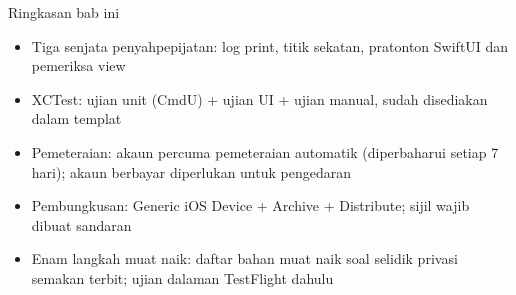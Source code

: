 \begin{tcbsummary}{Ringkasan bab ini}
\begin{itemize}
  \item Tiga senjata penyahpepijatan: log print, titik sekatan, pratonton SwiftUI dan pemeriksa view
  \item XCTest: ujian unit (CmdU) + ujian UI + ujian manual, sudah disediakan dalam templat
  \item Pemeteraian: akaun percuma pemeteraian automatik (diperbaharui setiap 7 hari); akaun berbayar diperlukan untuk pengedaran
  \item Pembungkusan: Generic iOS Device + Archive + Distribute; sijil wajib dibuat sandaran
  \item Enam langkah muat naik: daftar bahan muat naik soal selidik privasi semakan terbit; ujian dalaman TestFlight dahulu
\end{itemize}

\end{tcbsummary}
